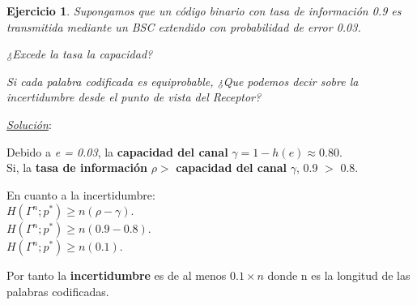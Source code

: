 \documentclass{beamer}
\theoremstyle{plain}
\theoremstyle{example}
\newtheorem{ejercicio} [Ejercicio]{Ejercicio}
\theoremstyle{example}
\begin{document}
\begin{frame}  \small \begin{ejercicio} 

Supongamos que un código binario con tasa de información 0.9  es transmitida mediante un BSC extendido con probabilidad de error 0.03. 
\vspace{0.1cm}

¿Excede  la tasa la capacidad? 
\vspace{0.1cm}

Si cada palabra codificada es equiprobable, ¿Que podemos decir sobre la incertidumbre desde el punto de vista del Receptor?


\end{ejercicio} 

 \textit{\underline{Solución}}:\\ 
\vspace{0.3cm}

Debido a \textit{e = 0.03}, la \textbf{capacidad del canal} $\gamma = 1 - h(e) \approx 0.80$. \\
\vspace{0.1cm}
Si, la \textbf{tasa de información} $\rho > $ \textbf{capacidad del canal} $\gamma$, 0.9 $>$ 0.8.
\vspace{0.2cm}

En cuanto a la incertidumbre:\\

$H(\Gamma^n;p^*) \geq n(\rho-\gamma).$ \\
$H(\Gamma^n;p^*) \geq n(0.9-0.8).$\\
$H(\Gamma^n;p^*) \geq n(0.1).$\\
\vspace{0.2cm}

Por tanto la \textbf{incertidumbre} es de al menos $0.1 \times n$ donde n es la longitud de las palabras codificadas.

\end{frame} 
\end{document}
